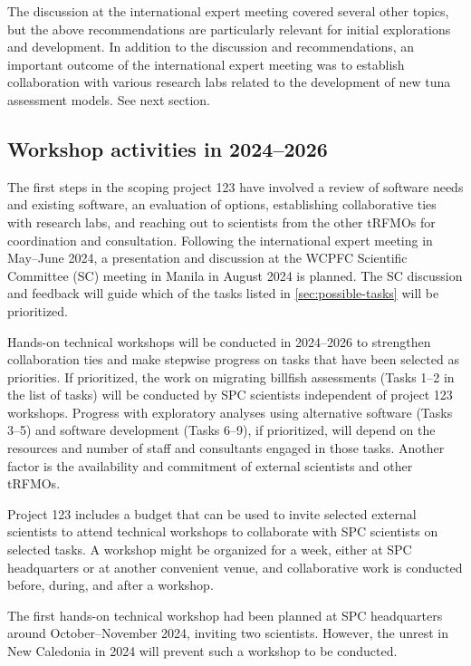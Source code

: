 \documentclass{SCreport}
\begin{document}
The discussion at the international expert meeting covered several other topics,
but the above recommendations are particularly relevant for initial explorations
and development. In addition to the discussion and recommendations, an important
outcome of the international expert meeting was to establish collaboration with
various research labs related to the development of new tuna assessment models.
See next section.

\subsection{Workshop activities in 2024--2026}

The first steps in the scoping project 123 have involved a review of software
needs and existing software, an evaluation of options, establishing
collaborative ties with research labs, and reaching out to scientists from the
other tRFMOs for coordination and consultation. Following the international
expert meeting in May--June 2024, a presentation and discussion at the WCPFC
Scientific Committee (SC) meeting in Manila in August 2024 is planned. The SC
discussion and feedback will guide which of the tasks listed in
\autoref{sec:possible-tasks} will be prioritized.

Hands-on technical workshops will be conducted in 2024--2026 to strengthen
collaboration ties and make stepwise progress on tasks that have been selected
as priorities. If prioritized, the work on migrating billfish assessments (Tasks
1--2 in the list of tasks) will be conducted by SPC scientists independent of
project 123 workshops. Progress with exploratory analyses using alternative
software (Tasks 3--5) and software development (Tasks 6--9), if prioritized,
will depend on the resources and number of staff and consultants engaged in
those tasks. Another factor is the availability and commitment of external
scientists and other tRFMOs.

Project 123 includes a budget that can be used to invite selected external
scientists to attend technical workshops to collaborate with SPC scientists on
selected tasks. A workshop might be organized for a week, either at SPC
headquarters or at another convenient venue, and collaborative work is conducted
before, during, and after a workshop.

The first hands-on technical workshop had been planned at SPC headquarters
around October--November 2024, inviting two scientists. However, the unrest in
New Caledonia in 2024 will prevent such a workshop to be conducted.
\end{document}
